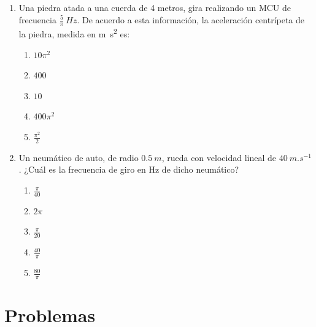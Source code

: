 \documentclass[letterpaper]{article}
\begin{document}
\begin{enumerate}
\item Una piedra atada a una cuerda de 4 metros, gira realizando un MCU de frecuencia $\frac5\pi\ \si{Hz}$. De acuerdo a esta información, la aceleración centrípeta de la piedra, medida en \si{m.s^2} es:
\begin{enumerate}[label=\Alph*)]
\item $10\pi^2$
\item $400$
\item $10$
\item $400\pi^2$
\item $\frac{\pi^2}{2}$
\end{enumerate}

\item Un neumático de auto, de radio $0.5\ \si{m}$, rueda con velocidad lineal de $40\ \si{m.s^{-1}}$. ¿Cuál es la frecuencia de giro en \si{Hz} de dicho neumático?

\begin{enumerate}[label=\Alph*)]

\item $\frac{\pi}{40}$
\item $2\pi$
\item $\frac{\pi}{20}$
\item $\frac{40}{\pi}$
\item $\frac{80}{\pi}$

\end{enumerate}



\end{enumerate}

\section*{Problemas}
\end{document}
